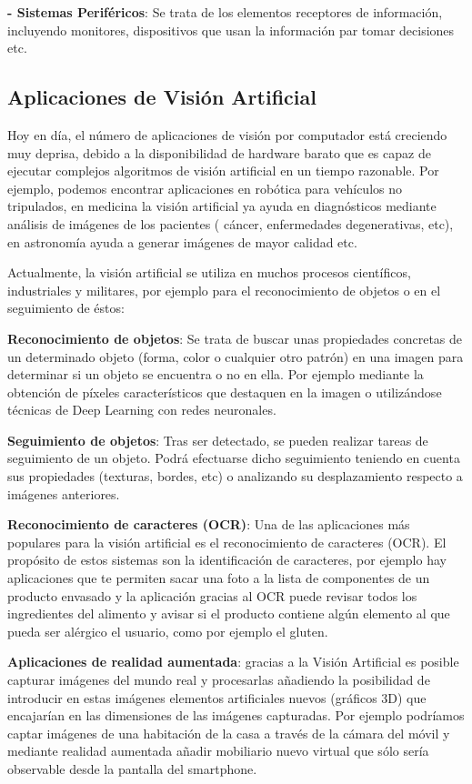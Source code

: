 	\textbf{- Sistemas Periféricos}: Se trata de los elementos receptores de información, incluyendo monitores, dispositivos que usan la información par tomar decisiones etc.

\subsection{Aplicaciones de Visión Artificial}
Hoy en día, el número de aplicaciones de visión por computador está creciendo muy deprisa, debido a la disponibilidad de hardware barato que es capaz de ejecutar complejos algoritmos de visión artificial en un tiempo razonable. Por ejemplo, podemos encontrar aplicaciones en robótica para vehículos no tripulados, en medicina la visión artificial ya ayuda en diagnósticos mediante análisis de imágenes de los pacientes ( cáncer, enfermedades degenerativas, etc), en astronomía ayuda a generar imágenes de mayor calidad etc.

Actualmente, la visión artificial se utiliza en muchos procesos científicos, industriales y militares, por ejemplo para el reconocimiento de objetos o en el seguimiento de éstos:

	\textbf{Reconocimiento de objetos}: Se trata de buscar unas propiedades concretas de un determinado objeto (forma, color o cualquier otro patrón) en una imagen para determinar si un objeto se encuentra o no en ella. Por ejemplo mediante la obtención de píxeles característicos que destaquen en la imagen o utilizándose técnicas de Deep Learning con redes neuronales.

	\textbf{Seguimiento de objetos}: Tras ser detectado, se pueden realizar tareas de seguimiento de un objeto. Podrá efectuarse dicho seguimiento teniendo en cuenta sus propiedades (texturas, bordes, etc) o analizando su desplazamiento respecto a imágenes anteriores.

	\textbf{Reconocimiento de caracteres (OCR)}:  Una de las aplicaciones más populares para la visión artificial es el reconocimiento de caracteres (OCR). El propósito de estos sistemas son la identificación de caracteres, por ejemplo hay aplicaciones que te permiten sacar una foto a la lista de componentes de un producto envasado y la aplicación gracias al OCR puede revisar todos los ingredientes del alimento y avisar si el producto contiene algún elemento al que pueda ser alérgico el usuario, como por ejemplo el gluten.

	\textbf{Aplicaciones de realidad aumentada}: gracias a la Visión Artificial es posible capturar imágenes del mundo real y procesarlas añadiendo la posibilidad de introducir en estas imágenes elementos artificiales nuevos (gráficos 3D) que encajarían en las dimensiones de las imágenes capturadas. Por ejemplo podríamos captar imágenes de una habitación de la casa a través de la cámara del móvil y mediante realidad aumentada añadir mobiliario nuevo virtual que sólo sería observable desde la pantalla del smartphone.

